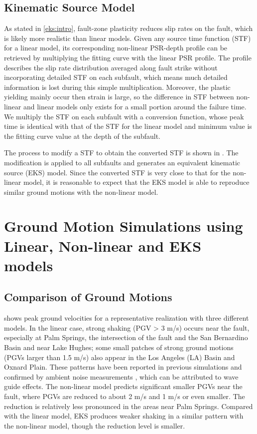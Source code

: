 \subsection{Kinematic Source Model}
As stated in \cref{eks:intro}, fault-zone plasticity reduces slip rates on the fault, which is likely more realistic than linear models. Given any source time function (STF) for a linear model, its corresponding non-linear PSR-depth profile can be retrieved by multiplying the fitting curve with the linear PSR profile. The profile describes the slip rate distribution averaged along fault strike without incorporating detailed STF on each subfault, which means much detailed information is lost during this simple multiplication. Moreover, the plastic yielding mainly occur then strain is large, so the difference in STF between non-linear and linear models only exists for a small portion around the failure time. We multiply the STF on each subfault with a conversion function, whose peak time is identical with that of the STF for the linear model and minimum value is the fitting curve value at the depth of the subfault.

The process to modify a STF to obtain the converted STF is shown in . The modification is applied to all subfaults and generates an equivalent kinematic source (EKS) model. Since the converted STF is very close to that for the non-linear model, it is reasonable to expect that the EKS model is able to reproduce similar ground motions with the non-linear model.

\section{Ground Motion Simulations using Linear, Non-linear and EKS models}

\subsection{Comparison of Ground Motions}
 shows peak ground velocities for a representative realization with three different models. In the linear case, strong shaking (PGV > 3 m/s) occurs near the fault, especially at Palm Springs, the intersection of the fault and the San Bernardino Basin and near Lake Hughes; some small patches of strong ground motions (PGVs larger than 1.5 m/s) also appear in the Los Angeles (LA) Basin and Oxnard Plain. These patterns have been reported in previous simulations \citep{olsen2009shakeout} and confirmed by ambient noise measurements \citep{denolle2014strong}, which can be attributed to wave guide effects. The non-linear model predicts significant smaller PGVs near the fault, where PGVs are reduced to about 2 m/s and 1 m/s or even smaller. The reduction is relatively less pronounced in the areas near Palm Springs. Compared with the linear model, EKS produces weaker shaking in a similar pattern with the non-linear model, though the reduction level is smaller.

